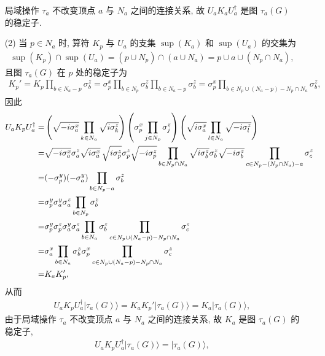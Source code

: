 \documentclass{assignment}
\begin{document}
\begin{pf}
\begin{itemize}
        局域操作 $\tau_a$ 不改变顶点 $a$ 与 $N_a$ 之间的连接关系, 故 $U_aK_aU_a^{\dagger}$ 是图 $\tau_a(G)$ 的稳定子.
        \item[(2)] 当 $p\in N_a$ 时, 算符 $K_p$ 与 $U_a$ 的支集 $\sup(K_a)$ 和 $\sup(U_a)$ 的交集为
        \begin{align}
            \sup(K_p)\cap\sup(U_a)=(p\cup N_p)\cap(a\cup N_a)=p\cup a\cup(N_p\cap N_a),
        \end{align}
        且图 $\tau_a(G)$ 在 $p$ 处的稳定子为
        \begin{align}
            K_p'=K_p\prod_{b\in N_a-p}\sigma_b^z=\sigma_p^x\prod_{b\in N_p}\sigma_b^z\prod_{b\in N_a-p}\sigma_b^z=\sigma_p^x\prod_{b\in N_p\cup(N_a-p)-N_p\cap N_a}\sigma_b^z,
        \end{align}
        因此
        \begin{align}
            \notag U_aK_pU_a^{\dagger}=&\left(\sqrt{-i\sigma_a^x}\prod_{k\in N_a}\sqrt{i\sigma_k^z}\right)\left(\sigma_p^x\prod_{j\in N_p}\sigma_j^z\right)\left(\sqrt{i\sigma_a^x}\prod_{l\in N_a}\sqrt{-i\sigma_l^z}\right)\\
            \notag=&\sqrt{-i\sigma_a^x}\sigma_a^z\sqrt{i\sigma_a^x}\,\sqrt{i\sigma_p^z}\sigma_p^z\sqrt{-i\sigma_p^z}\prod_{b\in N_p\cap N_a}\sqrt{i\sigma_b^z}\sigma_b^z\sqrt{-i\sigma_b^z}\prod_{c\in N_p-(N_p\cap N_a)-a}\sigma_c^z\\
            \notag=&(-\sigma_p^y)(-\sigma_a^y)\prod_{b\in N_p-a}\sigma_b^z\\
            \notag=&\sigma_p^y\sigma_a^y\sigma_a^z\prod_{b\in N_p}\sigma_b^z\\
            \notag=&\sigma_p^y\sigma_p^z\sigma_a^y\sigma_a^z\prod_{b\in N_a}\sigma_b^z\prod_{c\in N_p\cup(N_a-p)-N_p\cap N_a}\sigma_c^z\\
            \notag=&\sigma_a^x\prod_{b\in N_a}\sigma_b^z\sigma_p^x\prod_{c\in N_p\cup(N_a-p)-N_p\cap N_a}\sigma_c^z\\
            \notag=&K_aK_p',
        \end{align}
        从而
        \begin{align}
            U_aK_pU_a^{\dagger}\lvert\tau_a(G)\rangle=K_aK_p'\lvert\tau_a(G)\rangle=K_a\lvert\tau_a(G)\rangle,
        \end{align}
        由于局域操作 $\tau_a$ 不改变顶点 $a$ 与 $N_a$ 之间的连接关系, 故 $K_a$ 是图 $\tau_a(G)$ 的稳定子,
        \begin{align}
            U_aK_pU_a^{\dagger}\lvert\tau_a(G)\rangle=\lvert\tau_a(G)\rangle,
        \end{align}

\end{itemize}
\end{pf}
\end{document}
